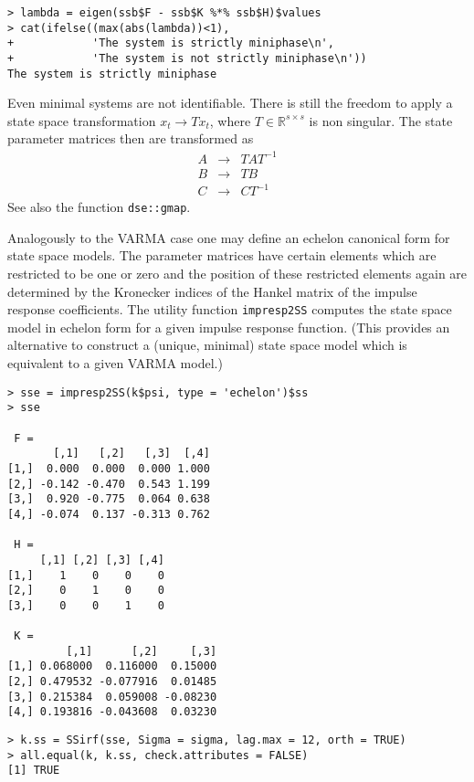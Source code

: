 \documentclass[]{article}
\begin{document}
\begin{verbatim}
> lambda = eigen(ssb$F - ssb$K %*% ssb$H)$values
> cat(ifelse((max(abs(lambda))<1), 
+            'The system is strictly miniphase\n', 
+            'The system is not strictly miniphase\n'))
The system is strictly miniphase
\end{verbatim}

Even minimal systems are not identifiable. There is still the freedom to
apply a state space transformation \(x_t \longrightarrow T x_t\), where
\(T\in \mathbb{R}^{s\times s}\) is non singular. The state parameter
matrices then are transformed as \[
\begin{array}{rcl}
A &\rightarrow& T A T^{-1} \\
B &\rightarrow& T B \\
C &\rightarrow& C T^{-1}
\end{array}
\] See also the function \texttt{dse::gmap}.

Analogously to the VARMA case one may define an echelon canonical form
for state space models. The parameter matrices have certain elements
which are restricted to be one or zero and the position of these
restricted elements again are determined by the Kronecker indices of the
Hankel matrix of the impulse response coefficients. The utility function
\texttt{impresp2SS} computes the state space model in echelon form for a
given impulse response function. (This provides an alternative to
construct a (unique, minimal) state space model which is equivalent to a
given VARMA model.)

\begin{verbatim}
> sse = impresp2SS(k$psi, type = 'echelon')$ss
> sse

 F =
       [,1]   [,2]   [,3]  [,4]
[1,]  0.000  0.000  0.000 1.000
[2,] -0.142 -0.470  0.543 1.199
[3,]  0.920 -0.775  0.064 0.638
[4,] -0.074  0.137 -0.313 0.762

 H =
     [,1] [,2] [,3] [,4]
[1,]    1    0    0    0
[2,]    0    1    0    0
[3,]    0    0    1    0

 K =
         [,1]      [,2]     [,3]
[1,] 0.068000  0.116000  0.15000
[2,] 0.479532 -0.077916  0.01485
[3,] 0.215384  0.059008 -0.08230
[4,] 0.193816 -0.043608  0.03230
\end{verbatim}

\begin{verbatim}
> k.ss = SSirf(sse, Sigma = sigma, lag.max = 12, orth = TRUE)
> all.equal(k, k.ss, check.attributes = FALSE)
[1] TRUE
\end{verbatim}
\end{document}

